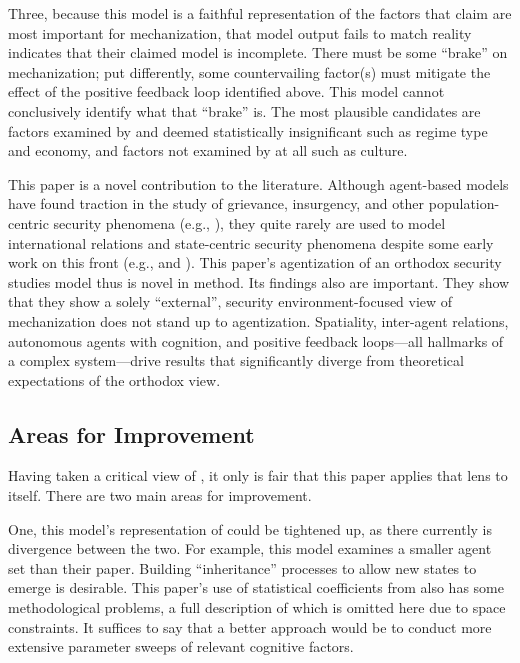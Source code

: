 \documentclass{article}
\begin{document}
Three, because this model is a
faithful representation of the factors that \cite{sechser2010army} claim are
most important for mechanization, that model output fails to match reality
indicates that their claimed model is incomplete. There must be some ``brake''
on mechanization; put differently, some countervailing factor(s) must mitigate the
effect of the positive feedback loop identified above. This model cannot
conclusively identify what that ``brake'' is. The most plausible candidates are
factors examined by \cite{sechser2010army} and deemed statistically
insignificant such as regime type and economy, and factors not examined by
\cite{sechser2010army} at all such as culture.

This paper is a novel contribution to the literature. Although agent-based
models have found traction in the study of grievance, insurgency, and
other population-centric security phenomena (e.g., \cite{epstein2002modeling}),
they quite rarely are used to model international relations and state-centric security
phenomena despite some early work on this front (e.g., \cite{cederman1997emergent} and \cite{axelrod1997complexity}). 
This paper's agentization of an orthodox security
studies model thus is novel in method. Its findings also are important. They
show that they show a solely ``external'', security
environment-focused view of mechanization does not stand up to agentization.
Spatiality, inter-agent relations, autonomous agents with cognition, and positive feedback
loops---all hallmarks of a complex system---drive results that significantly
diverge from theoretical expectations of the orthodox view.

\subsection{Areas for Improvement}

Having taken a critical view of \cite{sechser2010army}, it only is fair that
this paper applies that lens to itself. There are two main areas for
improvement.

One, this model's representation of \cite{sechser2010army} could be tightened
up, as there currently is divergence between the two. For example, this model
examines a smaller agent set than their paper. Building ``inheritance''
processes to allow new states to emerge is desirable. This paper's
use of statistical coefficients from \cite{sechser2010army} also has some
methodological problems, a full description of which is omitted here due to
space constraints. It suffices to say that a better approach would be to conduct
more extensive parameter sweeps of relevant cognitive factors.
\end{document}
